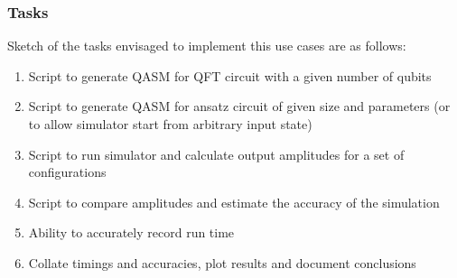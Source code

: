 \subsubsection{Tasks}
Sketch of the tasks envisaged to implement this use cases are as follows:

\begin{enumerate}
\item Script to generate QASM for QFT circuit with a given number of qubits
\item Script to generate QASM for ansatz circuit of given size and parameters (or to allow simulator start from arbitrary input state)
\item Script to run simulator and calculate output amplitudes for a set of configurations
\item Script to compare amplitudes and estimate the accuracy of the simulation
\item Ability to accurately record run time
\item Collate timings and accuracies, plot results and document conclusions
\end{enumerate}
